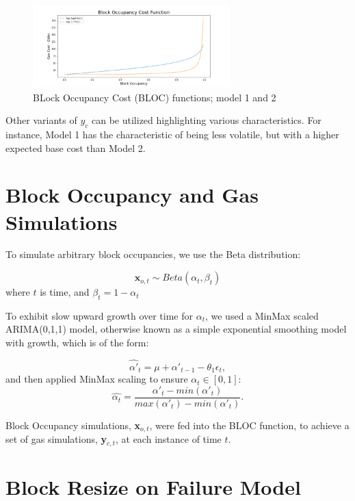 \documentclass[peerreview]{ieeesyscoin}
\begin{document}
\begin{figure}[h!]
\includegraphics[width=3in]{img/blk_occupancy_cost_fn.png}
\caption{BLock Occupancy Cost (BLOC) functions; model 1 and 2} 
\label{fig:bloc}
\end{figure} 

Other variants of $y_{c}$ can be utilized highlighting various characteristics. For instance, Model 1 has the characteristic of being less volatile, but with a higher expected base cost than Model 2.

\section{Block Occupancy and Gas Simulations}

To simulate arbitrary block occupancies, we use the Beta distribution:

 \begin{equation}
\textbf{x}_{o,t} \sim Beta(\alpha_{t},\beta_{t})
 \end{equation}
 where $t$ is time, and $\beta_{t} = 1-\alpha_{t}$
 
To exhibit slow upward growth over time for $\alpha_{t}$, we used a MinMax scaled ARIMA(0,1,1) model, otherwise known as a simple exponential smoothing model with growth, which is of the form:

\begin{equation}
\hat{\alpha'}_{t} = \mu + \alpha'_{t-1} - \theta_{1}\epsilon_{t},
\end{equation}
and then applied MinMax scaling to ensure $\alpha_{t} \in [0,1]$:
\begin{equation}
\hat{\alpha_{t}} = \dfrac{\alpha'_{t} - min(\alpha'_{t})}{  max(\alpha'_{t}) - min(\alpha'_{t}) }.
\end{equation}

Block Occupancy simulations, \textbf{x}$_{o,t}$, were fed into the BLOC function, to achieve a set of gas simulations, \textbf{y}$_{c,t}$, at each instance of time $t$.

\section{Block Resize on Failure Model}
\label{appendix:block_resize}
\end{document}
